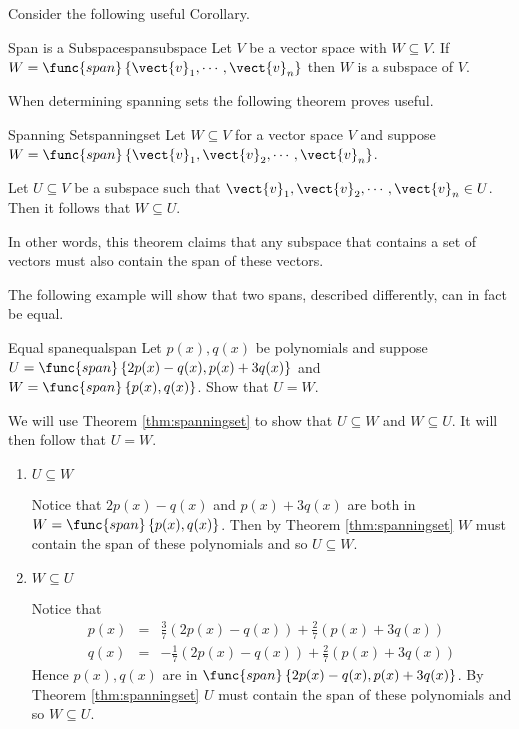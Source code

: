 Consider the following useful Corollary.

\begin{corollary}{Span is a Subspace}{spansubspace}
Let $V$ be a vector space with $W \subseteq V$. If $W = \func{span} \left\{ \vect{v}_1, \cdots,  \vect{v}_n \right\}$ then $W$ is a subspace of $V$.
\end{corollary}

When determining spanning sets the following theorem proves useful.

\begin{theorem}{Spanning Set}{spanningset}
Let $W \subseteq V$ for a vector space $V$ and suppose $W = \func{span} \left\{ \vect{v}_1, \vect{v}_2, \cdots, \vect{v}_n \right\}$. 

Let $U \subseteq V$ be a subspace such that $\vect{v}_1, \vect{v}_2, \cdots, \vect{v}_n \in U$. Then it follows that $W \subseteq U$. 
\end{theorem}

In other words, this theorem claims that any subspace that contains a set of vectors must also contain the span of these vectors. 

The following example will show that two spans, described differently, can in fact be equal. 

\begin{example}{Equal span}{equalspan}
Let $p(x), q(x)$ be polynomials and suppose $U = \func{span}\left\{ 2p(x) - q(x), p(x) + 3q(x)\right\} $ and $W =  \func{span}\left\{ p(x), q(x) \right\}$. Show that $U = W$. 
\end{example}

\begin{solution}
We will use Theorem \ref{thm:spanningset} to show that $U \subseteq W$ and $W \subseteq U$. It will then follow that $U=W$. 
\begin{enumerate}
\item $U \subseteq W$

Notice that $2p(x) - q(x)$ and $p(x) + 3q(x)$  are both in $W = \func{span} \left\{ p(x), q(x) \right\}$. Then by Theorem \ref{thm:spanningset} $W$ must contain the span of these polynomials and so $U \subseteq W$. 

\item $W \subseteq U$

Notice that 
\begin{eqnarray*}
p(x) &=& \frac{3}{7} \left( 2p(x) - q(x) \right)  + \frac{2}{7} \left( p(x) + 3q(x)\right) \\
q(x) &=& -\frac{1}{7} \left( 2p(x) - q(x) \right)  + \frac{2}{7} \left( p(x) + 3q(x)\right)
\end{eqnarray*}
Hence $p(x), q(x)$ are in $\func{span} \left\{ 2p(x) - q(x), p(x) + 3q(x) \right\}$. By Theorem \ref{thm:spanningset} $U$ must contain the span of these polynomials and so $W \subseteq U$. 
\end{enumerate}
\end{solution}


